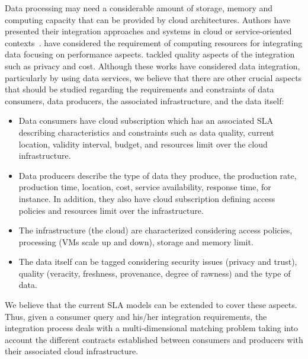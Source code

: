 \documentclass[11pt,a4paper,oneside]{report}
\begin{document}
Data processing may need a considerable amount of storage, memory and computing capacity that can be provided by cloud architectures. Authors have presented their integration approaches and systems in cloud or service-oriented contexts~\cite{Correndo2010,ElSheikh2013,Tian2010,YauY08}. \cite{Correndo2010,ElSheikh2013} have considered the requirement of computing resources for integrating data focusing on performance aspects. \cite{Tian2010,YauY08} tackled quality aspects of the integration such as privacy and cost. Although these works have considered data integration, particularly by using data services, we believe that there are other crucial aspects that should be studied regarding the requirements and constraints of data consumers, data producers, the associated infrastructure, and the data itself:
\begin{itemize}
\item Data consumers have cloud subscription which has an associated SLA describing characteristics and constraints such as data quality, current location, validity interval, budget, and resources limit over the cloud infrastructure.
\item Data producers describe the type of data they produce, the production rate, production time, location, cost, service availability, response time, for instance. In addition, they also have cloud subscription defining access policies and resources limit over the infrastructure. 
\item The infrastructure (the cloud) are characterized considering access policies, processing (VMs scale up and down), storage and memory limit. 
\item The data itself can be tagged considering security issues (privacy and trust), quality (veracity, freshness, provenance, degree of rawness) and the type of data.
\end{itemize}
We believe that the current SLA models can be extended to cover these aspects. Thus, given a consumer query and his/her integration requirements, the integration process deals with a multi-dimensional matching problem taking into account the different contracts established between consumers and producers with their associated cloud infrastructure.
\end{document}
